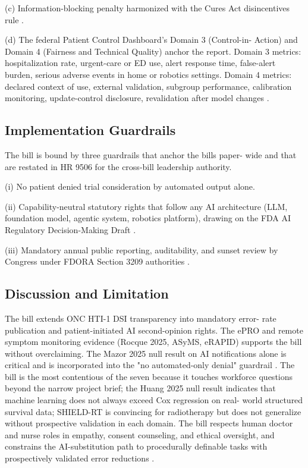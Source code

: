 (c) Information-blocking penalty harmonized with the Cures Act
disincentives rule \cite{federal_register_info_blocking_disincentives_2024}.

(d) The federal Patient Control Dashboard's Domain 3 (Control-in-
Action) and Domain 4 (Fairness and Technical Quality) anchor the
report. Domain 3 metrics: hospitalization rate, urgent-care or ED
use, alert response time, false-alert burden, serious adverse events
in home or robotics settings. Domain 4 metrics: declared context of
use, external validation, subgroup performance, calibration
monitoring, update-control disclosure, revalidation after model
changes \cite{rocque2025remote_symptom_monitoring,
gonzalez2025bayesian_urgent_care_nsclc,
dronca2026cancer_care_beyond_walls, target2025robotic_bronchoscopy,
fda_ai_regulatory_decision_draft_2025, vorontsov2024virchow}.

\subsection{Implementation Guardrails}

The bill is bound by three guardrails that anchor the bills paper-
wide and that are restated in HR 9506 for the cross-bill leadership
authority.

(i) No patient denied trial consideration by automated output
alone.

(ii) Capability-neutral statutory rights that follow any AI
architecture (LLM, foundation model, agentic system, robotics
platform), drawing on the FDA AI Regulatory Decision-Making Draft
\cite{fda_ai_regulatory_decision_draft_2025}.

(iii) Mandatory annual public reporting, auditability, and sunset
review by Congress under FDORA Section 3209 authorities
\cite{rank4_fdora_fda_modernization_2022}.

\subsection{Discussion and Limitation}

The bill extends ONC HTI-1 DSI transparency into mandatory error-
rate publication and patient-initiated AI second-opinion rights. The
ePRO and remote symptom monitoring evidence (Rocque 2025, ASyMS,
eRAPID) supports the bill without overclaiming. The Mazor 2025 null
result on AI notifications alone is critical and is incorporated
into the "no automated-only denial" guardrail
\cite{rank9_onc_hti1_2023, rocque2025remote_symptom_monitoring,
kearney2009asyms, maguire2017esmart, absolom2021erapid,
mazor2025ai_notifications_trial}. The bill is the most contentious
of the seven because it touches workforce questions beyond the
narrow project brief; the Huang 2025 null result indicates that
machine learning does not always exceed Cox regression on real-
world structured survival data; SHIELD-RT is convincing for
radiotherapy but does not generalize without prospective validation
in each domain. The bill respects human doctor and nurse roles in
empathy, consent counseling, and ethical oversight, and constrains
the AI-substitution path to procedurally definable tasks with
prospectively validated error reductions \cite{kawchak_2026_19994945,
kawchak_2026_19119939}.

